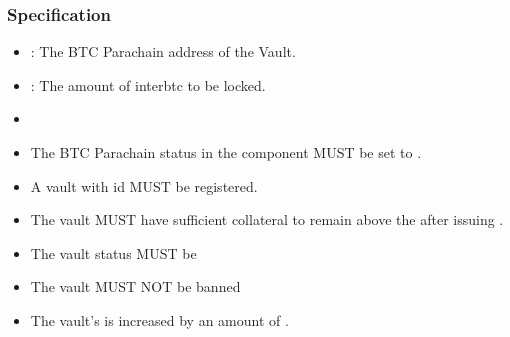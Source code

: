 \documentclass[a4paper,10pt,english]{sphinxmanual}
\begin{document}
\subsubsection{Specification}
\label{\detokenize{spec/vault-registry:id14}}


\begin{itemize}
\item {} 
: The BTC Parachain address of the Vault.

\item {} 
: The amount of interbtc to be locked.

\end{itemize}

\begin{itemize}
\item {} 

\end{itemize}

\begin{itemize}
\item {} 
The BTC Parachain status in the {\hyperref[\detokenize{spec/security:security}]{}} component MUST be set to .

\item {} 
A vault with id  MUST be registered.

\item {} 
The vault MUST have sufficient collateral to remain above the  after issuing .

\item {} 
The vault status MUST be 

\item {} 
The vault MUST NOT be banned

\end{itemize}

\begin{itemize}
\item {} 
The vault’s  is increased by an amount of  .

\end{itemize}
\end{document}
